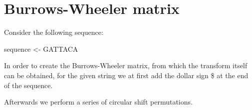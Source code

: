 \documentclass[
]{book}
\newenvironment{Shaded}{\begin{snugshade}}{\end{snugshade}}
\newcommand{\AttributeTok}[1]{\textcolor[rgb]{0.77,0.63,0.00}{#1}}
\newcommand{\CommentTok}[1]{\textcolor[rgb]{0.56,0.35,0.01}{\textit{#1}}}
\newcommand{\ControlFlowTok}[1]{\textcolor[rgb]{0.13,0.29,0.53}{\textbf{#1}}}
\newcommand{\DecValTok}[1]{\textcolor[rgb]{0.00,0.00,0.81}{#1}}
\newcommand{\FunctionTok}[1]{\textcolor[rgb]{0.00,0.00,0.00}{#1}}
\newcommand{\NormalTok}[1]{#1}
\newcommand{\OtherTok}[1]{\textcolor[rgb]{0.56,0.35,0.01}{#1}}
\newcommand{\SpecialCharTok}[1]{\textcolor[rgb]{0.00,0.00,0.00}{#1}}
\newcommand{\StringTok}[1]{\textcolor[rgb]{0.31,0.60,0.02}{#1}}
\begin{document}
\hypertarget{burrows-wheeler-matrix}{%
\section{Burrows-Wheeler matrix}\label{burrows-wheeler-matrix}}

Consider the following sequence:

\begin{Shaded}
\begin{Highlighting}[numbers=left,,]
\NormalTok{sequence }\OtherTok{\textless{}{-}} \StringTok{\textquotesingle{}GATTACA\textquotesingle{}}
\end{Highlighting}
\end{Shaded}

In order to create the Burrows-Wheeler matrix, from which the transform itself can be obtained, for the given string we at first add the dollar sign \$ at the end of the sequence.

\begin{Shaded}
\end{Shaded}

Afterwards we perform a series of circular shift permutations.

\begin{Shaded}
\end{Shaded}
\end{document}
